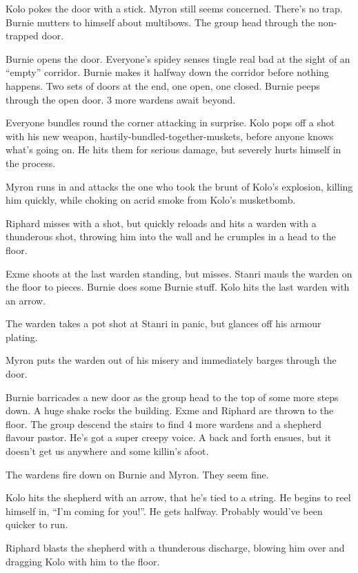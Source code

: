 Kolo pokes the door with a stick. Myron still seems concerned. There's no trap. Burnie mutters to himself about multibows. The group head through the non-trapped door.\medskip

Burnie opens the door. Everyone's spidey senses tingle real bad at the sight of an ``empty'' corridor. Burnie makes it halfway down the corridor before nothing happens. Two sets of doors at the end, one open, one closed. Burnie peeps through the open door. 3 more wardens await beyond.\medskip

Everyone bundles round the corner attacking in surprise. Kolo pops off a shot with his new weapon, hastily-bundled-together-muskets, before anyone knows what's going on. He hits them for serious damage, but severely hurts himself in the process.\medskip

Myron runs in and attacks the one who took the brunt of Kolo's explosion, killing him quickly, while choking on acrid smoke from Kolo's musketbomb.\medskip

Riphard misses with a shot, but quickly reloads and hits a warden with a thunderous shot, throwing him into the wall and he crumples in a head to the floor.\medskip

Exme shoots at the last warden standing, but misses. Stanri mauls the warden on the floor to pieces. Burnie does some Burnie stuff. Kolo hits the last warden with an arrow.\medskip

The warden takes a pot shot at Stanri in panic, but glances off his armour plating.\medskip

Myron puts the warden out of his misery and immediately barges through the door.\medskip

Burnie barricades a new door as the group head to the top of some more steps down. A huge shake rocks the building. Exme and Riphard are thrown to the floor. The group descend the stairs to find 4 more wardens and a shepherd flavour pastor. He's got a super creepy voice. A back and forth ensues, but it doesn't get us anywhere and some killin's afoot.\medskip

The wardens fire down on Burnie and Myron. They seem fine.\medskip

Kolo hits the shepherd with an arrow, that he's tied to a string. He begins to reel himself in, ``I'm coming for you!''. He gets halfway. Probably would've been quicker to run.\medskip

Riphard blasts the shepherd with a thunderous discharge, blowing him over and dragging Kolo with him to the floor.\medskip

